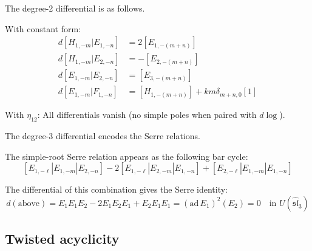 \begin{computation}\label{comp:sl3-bar}
The degree-2 differential is as follows.

With constant form:
\begin{align*}
d[H_{1,-m}|E_{1,-n}] &= 2[E_{1,-(m+n)}] \\
d[H_{1,-m}|E_{2,-n}] &= -[E_{2,-(m+n)}] \\
d[E_{1,-m}|E_{2,-n}] &= [E_{3,-(m+n)}] \\
d[E_{1,-m}|F_{1,-n}] &= [H_{1,-(m+n)}] + km\delta_{m+n,0}[1]
\end{align*}

With $\eta_{12}$: All differentials vanish (no simple poles when paired with $d\log$).

The degree-3 differential encodes the Serre relations.

The simple-root Serre relation appears as the following bar cycle:
\[
[E_{1,-\ell}|E_{1,-m}|E_{2,-n}] - 2[E_{1,-\ell}|E_{2,-m}|E_{1,-n}] + [E_{2,-\ell}|E_{1,-m}|E_{1,-n}]
\]

The differential of this combination gives the Serre identity:
\[
d(\text{above}) = E_1 E_1 E_2 - 2 E_1 E_2 E_1 + E_2 E_1 E_1 = (\text{ad}\, E_1)^2(E_2) = 0 \quad \text{in } U(\hat{\mathfrak{sl}}_3)
\]
\end{computation}


\subsection{Twisted acyclicity}

